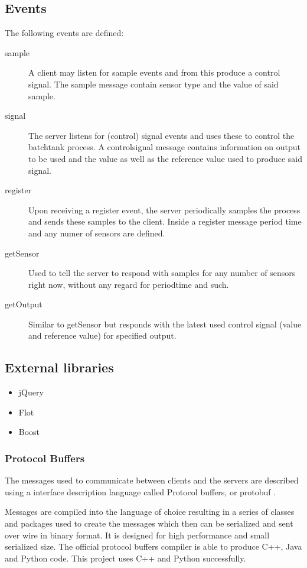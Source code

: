 \documentclass{article}
\begin{document}
\subsection{Events}
The following events are defined:

\begin{description}
\item[sample]
  A client may listen for sample events and from this produce a control
  signal. The sample message contain sensor type and the value of said
  sample.
\item[signal]
  The server listens for (control) signal events and uses these to
  control the batchtank process. A controlsignal message contains
  information on output to be used and the value as well as the
  reference value used to produce said signal.
\item[register]
  Upon receiving a register event, the server periodically samples the
  process and sends these samples to the client. Inside a register
  message period time and any numer of sensors are defined.
\item[getSensor]
  Used to tell the server to respond with samples for any number of
  sensors right now, without any regard for periodtime and such.
\item[getOutput]
  Similar to getSensor but responds with the latest used control signal
  (value and reference value) for specified output.
\end{description}

\subsection{External libraries}
\begin{itemize}
\item{jQuery}
\item{Flot}
\item{Boost}
\end{itemize}


\subsubsection{Protocol Buffers}
The messages used to communicate between clients and the servers are
described using a interface description language called Protocol
buffers, or protobuf \cite{protobuf}.

Messages are compiled into the language of choice resulting in a series
of classes and packages used to create the messages which then can be
serialized and sent over wire in binary format. It is designed for high
performance and small serialized size. The official protocol buffers
compiler is able to produce C++, Java and Python code. This project uses
C++ and Python successfully.
\end{document}
